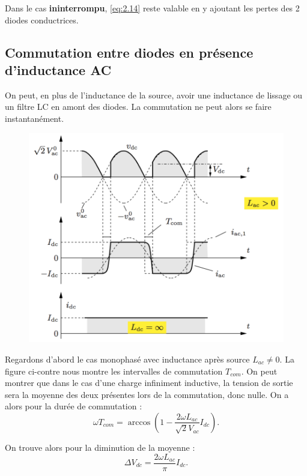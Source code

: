 		Dans le cas \textbf{ininterrompu}, \eqref{eq:2.14} reste valable en y ajoutant les pertes des 2 diodes conductrices. 
		
	\subsection{Commutation entre diodes en présence d'inductance AC}
		On peut, en plus de l'inductance de la source, avoir une inductance de lissage ou un filtre LC en amont des diodes. La commutation ne peut alors se faire instantanément. \\
		
	\begin{figure}
		\vspace{-5mm}
		\includegraphics[scale=0.3]{ch2/12}
		\end{figure} 
		Regardons d'abord le cas monophasé avec inductance après source $L_{ac} \neq 0$. La figure ci-contre nous montre les intervalles de commutation $T_{com}$. On peut montrer que dans le cas d'une charge infiniment inductive, la tension de sortie sera la moyenne des deux présentes lors de la commutation, donc nulle. On a alors pour la durée de commutation : 
		\begin{equation}
			\omega T_{com} = \arccos \left( 1-\frac{2\omega L_{ac}}{\sqrt{2}V_{ac}} I_{dc}\right). 
		\end{equation}
		
		On trouve alors pour la diminution de la moyenne : 
		\begin{equation}
			\Delta V_{dc} = \frac{2\omega L_{ac}}{\pi}I_{dc}. 
		\end{equation}
		
